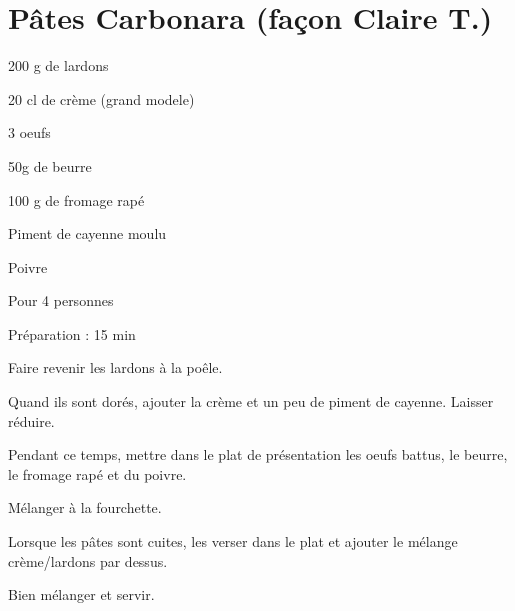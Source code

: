 \section[\normalsize{P\^ates Carbonara (fa\c con Claire T.)}]{P\^ates Carbonara (fa\c con Claire T.)}

\begin{ingredients}
\item 200 g de lardons
\item 20 cl  de cr\`eme (grand modele)
\item 3 oeufs
\item 50g de beurre
\item 100 g de fromage rap\'e
\item Piment de cayenne moulu
\item Poivre
\end{ingredients}
\begin{infos}
\item Pour 4 personnes
\item Préparation : 15 min
\end{infos}
\begin{etapes}
\item Faire revenir les lardons \`a la po\^ele. 
\item Quand ils sont dor\'es, ajouter la cr\`eme et un peu de piment de cayenne. Laisser r\'eduire.
\item Pendant ce temps, mettre dans le plat de pr\'esentation les oeufs battus, le beurre, le fromage rap\'e et du poivre. 
\item M\'elanger \`a la fourchette.
\item Lorsque les p\^ates sont cuites, les verser dans le plat et ajouter le m\'elange cr\`eme/lardons par dessus. 
\item Bien m\'elanger et servir.
\end{etapes}
\begin{conseils}
\end{conseils}
